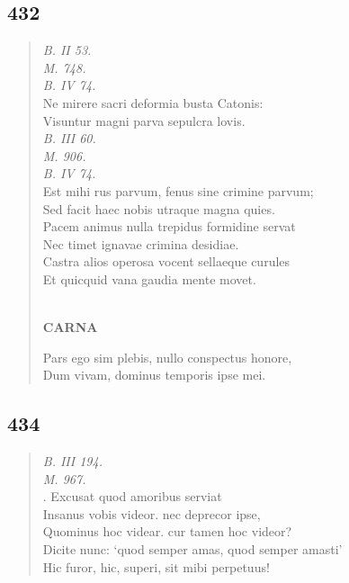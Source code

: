 \documentclass[11pt, a4paper]{report}
\begin{document}
            \subsection*{432}
      \begin{verse}
      \textit{B. II 53.} \\ \textit{M. 748.} \\ \textit{B. IV 74.} \\ Ne mirere sacri deformia busta Catonis: \\ Visuntur magni parva sepulcra lovis. \\ \textit{B. III 60.} \\ \textit{M. 906.} \\ \textit{B. IV 74.} \\ Est mihi rus parvum, fenus sine crimine parvum; \\ Sed facit haec nobis utraque magna quies. \\ Pacem animus nulla trepidus formidine servat \\ Nec timet ignavae crimina desidiae. \\ Castra alios operosa vocent sellaeque curules \\ Et quicquid vana gaudia mente movet. \\ 
        ﻿\pagebreak 
     \marginpar{[330]} \begin{center} \textbf{CARNA} \end{center}Pars ego sim plebis, nullo conspectus honore, \\ Dum vivam, dominus temporis ipse mei. \\ 
      \end{verse}
  
            \subsection*{434}
      \begin{verse}
      \textit{B. III 194.} \\ \textit{M. 967.} \\ . Excusat quod amoribus serviat \\ Insanus vobis videor. nec deprecor ipse, \\ Quominus hoc videar. cur tamen hoc videor? \\ Dicite nunc: ‘quod semper amas, quod semper amasti’ \\ Hic furor, hic, superi, sit mibi perpetuus! \\ 
      \end{verse}
  
\end{document}
